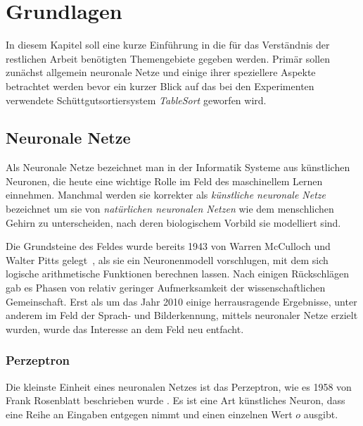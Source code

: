 \chapter{Grundlagen}




In diesem Kapitel soll eine kurze Einführung in die für das Verständnis der restlichen Arbeit benötigten Themengebiete gegeben werden.
Primär sollen zunächst allgemein neuronale Netze und einige ihrer speziellere Aspekte betrachtet werden 
bevor ein kurzer Blick auf das bei den Experimenten verwendete Schüttgutsortiersystem \textit{TableSort} geworfen wird. 

% 

\section{Neuronale Netze}

Als Neuronale Netze  %
bezeichnet man in der Informatik Systeme aus künstlichen Neuronen, die heute eine wichtige Rolle im Feld des maschinellem Lernen einnehmen.
Manchmal werden sie korrekter als \textit{künstliche neuronale Netze} bezeichnet um sie von \textit{natürlichen neuronalen Netzen} 
wie dem menschlichen Gehirn zu unterscheiden, nach deren biologischem Vorbild sie modelliert sind.

Die Grundsteine des Feldes wurde bereits 1943 von Warren McCulloch und Walter Pitts gelegt~\cite{mcculloch1943logical}, 
als sie ein Neuronenmodell vorschlugen, mit dem sich logische arithmetische Funktionen berechnen lassen. 
Nach einigen Rückschlägen gab es Phasen von relativ geringer Aufmerksamkeit der wissenschaftlichen Gemeinschaft. 
Erst als um das Jahr 2010 einige herrausragende Ergebnisse, unter anderem im Feld der Sprach- und Bilderkennung, 
mittels neuronaler Netze erzielt wurden, wurde das Interesse an dem Feld neu entfacht. 



\subsection{{Perzeptron}}
Die kleinste Einheit eines neuronalen Netzes ist das Perzeptron, wie es 1958 von Frank Rosenblatt beschrieben wurde \cite{rosenblatt1958perceptron}.
Es ist eine Art künstliches Neuron, dass eine Reihe an Eingaben entgegen nimmt und einen einzelnen Wert \(o\) ausgibt.

